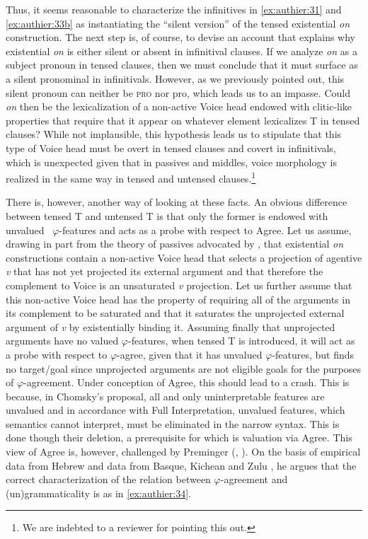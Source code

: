 \documentclass[output=paper,colorlinks,citecolor=brown]{langscibook}
\begin{document}
Thus, it seems reasonable to characterize the infinitives in \ref{ex:authier:31} and \ref{ex:authier:33b} as instantiating the “silent version” of the tensed existential \textit{on} construction. The next step is, of course, to devise an account that explains why existential \textit{on }is either silent or absent in infinitival clauses. If we analyze \textit{on} as a subject pronoun in tensed clauses, then we must conclude that it must surface as a silent pronominal in infinitivals. However, as we previously pointed out, this silent pronoun can neither be \textsc{pro} nor pro, which leads us to an impasse. Could \textit{on} then be the lexicalization of a non-active Voice head endowed with clitic-like properties that require that it appear on whatever element lexicalizes T in tensed clauses? While not implausible, this hypothesis leads us to stipulate that this type of Voice head must be overt in tensed clauses and covert in infinitivals, which is unexpected given that in passives and middles, voice morphology is realized in the same way in tensed and untensed clauses.\footnote{We are indebted to a reviewer for pointing this out.}

There is, however, another way of looking at these facts. An obvious difference between tensed T and untensed T is that only the former is endowed with unvalued \ ${\varphi}${}-features and acts as a probe with respect to Agree. Let us assume, drawing in part from the theory of passives advocated by \citet{bruening2013a}, that existential \textit{on} constructions contain a non-active Voice head that selects a projection of agentive \textit{v} that has not yet projected its external argument and that therefore the complement to Voice is an unsaturated \textit{v} projection. Let us further assume that this non-active Voice head has the property of requiring all of the arguments in its complement to be saturated and that it saturates the unprojected external argument of \textit{v} by existentially binding it. Assuming finally that unprojected arguments have no valued ${\varphi}${}-features, when tensed T is introduced, it will act as a probe with respect to ${\varphi}${}-agree, given that it has unvalued ${\varphi}${}-features, but finds no target/goal since unprojected arguments are not eligible goals for the purposes of ${\varphi}${}-agreement. Under \citet{chomsky2001a} conception of Agree, this should lead to a crash. This is because, in Chomsky’s proposal, all and only uninterpretable features are unvalued and in accordance with Full Interpretation, unvalued features, which semantics cannot interpret, must be eliminated in the narrow syntax. This is done though their deletion, a prerequisite for which is valuation via Agree. This view of Agree is, however, challenged by Preminger (\citeyear{preminger2009a}, \citeyear{preminger2014a}). On the basis of empirical data from Hebrew \citep{preminger2009a} and data from Basque, Kichean and Zulu \citep{preminger2014a}, he argues that the correct characterization of the relation between ${\varphi}${}-agreement and (un)grammaticality is as in \ref{ex:authier:34}.
\end{document}
